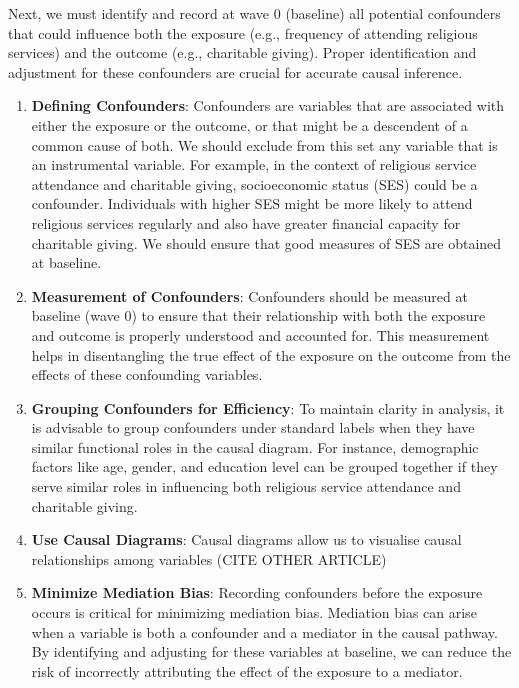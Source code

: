 \documentclass[
  singlecolumn,
  9pt]{article}
\begin{document}
Next, we must identify and record at wave 0 (baseline) all potential
confounders that could influence both the exposure (e.g., frequency of
attending religious services) and the outcome (e.g., charitable giving).
Proper identification and adjustment for these confounders are crucial
for accurate causal inference.

\begin{enumerate}
\def\labelenumi{\arabic{enumi}.}
\item
  \textbf{Defining Confounders}: Confounders are variables that are
  associated with either the exposure or the outcome, or that might be a
  descendent of a common cause of both. We should exclude from this set
  any variable that is an instrumental variable. For example, in the
  context of religious service attendance and charitable giving,
  socioeconomic status (SES) could be a confounder. Individuals with
  higher SES might be more likely to attend religious services regularly
  and also have greater financial capacity for charitable giving. We
  should ensure that good measures of SES are obtained at baseline.
\item
  \textbf{Measurement of Confounders}: Confounders should be measured at
  baseline (wave 0) to ensure that their relationship with both the
  exposure and outcome is properly understood and accounted for. This
  measurement helps in disentangling the true effect of the exposure on
  the outcome from the effects of these confounding variables.
\item
  \textbf{Grouping Confounders for Efficiency}: To maintain clarity in
  analysis, it is advisable to group confounders under standard labels
  when they have similar functional roles in the causal diagram. For
  instance, demographic factors like age, gender, and education level
  can be grouped together if they serve similar roles in influencing
  both religious service attendance and charitable giving.
\item
  \textbf{Use Causal Diagrams}: Causal diagrams allow us to visualise
  causal relationships among variables (CITE OTHER ARTICLE)
\item
  \textbf{Minimize Mediation Bias}: Recording confounders before the
  exposure occurs is critical for minimizing mediation bias. Mediation
  bias can arise when a variable is both a confounder and a mediator in
  the causal pathway. By identifying and adjusting for these variables
  at baseline, we can reduce the risk of incorrectly attributing the
  effect of the exposure to a mediator.
\end{enumerate}
\end{document}

